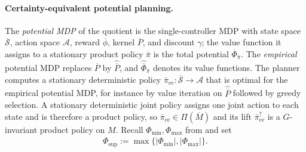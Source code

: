 \documentclass{article}
\theoremstyle{plain}
\theoremstyle{definition}
\theoremstyle{remark}
\newcommand{\St}{\mathcal{S}}
\newcommand{\Ac}{\mathcal{A}}
\newcommand{\abs}[1]{\left\lvert#1\right\rvert}
\newcommand{\quotient}[1]{\overline{#1}}
\newcommand{\Potbar}{\overline{\Phi}}
\newcommand{\Phisup}{\Phi_{\mathrm{sup}}}
\newcommand{\hatP}{\widehat{\quotient P}}
\newcommand{\hatPot}{\widehat{\Potbar}}
\newcommand{\pice}{\bar\pi_{\mathrm{ce}}}
\begin{document}
\paragraph{Certainty-equivalent potential planning.}
The \emph{potential MDP} of the quotient is the single-controller MDP with
state space $\quotient\St$, action space $\Ac$, reward $\quotient\phi$, kernel
$\quotient P$, and discount $\gamma$; the value function it assigns to a
stationary product policy $\bar\pi$ is the total potential
$\Potbar_{\bar\pi}$. The \emph{empirical} potential MDP replaces
$\quotient P$ by $\hatP$, and $\hatPot_{\bar\pi}$ denotes its value functions.
The planner computes a stationary deterministic policy
$\pice:\quotient\St\to\Ac$ that is optimal for the empirical potential MDP,
for instance by value iteration on $\hatP$ followed by greedy selection. A
stationary deterministic joint policy assigns one joint action to each state
and is therefore a product policy, so $\pice\in\Pi(\quotient M)$ and its lift
$\pice^\uparrow$ is a $G$-invariant product policy on $M$. Recall
$\Phi_{\min},\Phi_{\max}$ from  and set
\begin{align*}
  \Phisup
  :=
  \max\{\abs{\Phi_{\min}},\abs{\Phi_{\max}}\}.
\end{align*}
\end{document}
